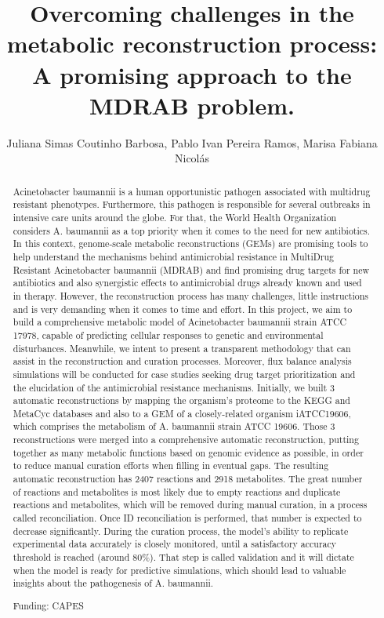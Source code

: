 \documentclass[twoside]{article}
\title{\vspace{-15mm}\fontsize{24pt}{10pt}\selectfont\textbf{ Overcoming challenges in the metabolic reconstruction process: A promising approach to the MDRAB problem. }} %
\author{ Juliana Simas Coutinho Barbosa, Pablo Ivan Pereira Ramos, Marisa Fabiana Nicol\'as }
\affil{ Laborat\'orio Nacional de Computa\c{c}\~ao Cient\'{\i}fica }
\date{}
\begin{document}
  
  
  \maketitle %
  
  
  \thispagestyle{fancy} %
  
  
  \begin{abstract}
  Acinetobacter baumannii is a human opportunistic pathogen associated with multidrug resistant phenotypes. Furthermore,  this pathogen is responsible for several outbreaks in intensive care units around the globe. For that,  the World Health Organization considers A. baumannii as a top priority when it comes to the need for new antibiotics. In this context,  genome-scale metabolic reconstructions (GEMs) are promising tools to help understand the mechanisms behind antimicrobial resistance in MultiDrug Resistant Acinetobacter baumannii (MDRAB) and find promising drug targets for new antibiotics and also synergistic effects to antimicrobial drugs already known and used in therapy. However,  the reconstruction process has many challenges,  little instructions and is very demanding when it comes to time and effort. In this project,  we aim to build a comprehensive metabolic model of Acinetobacter baumannii strain ATCC 17978,  capable of predicting cellular responses to genetic and environmental disturbances. Meanwhile,  we intent to present a transparent methodology that can assist in the reconstruction and curation processes. Moreover,  flux balance analysis simulations will be conducted for case studies seeking drug target prioritization and the elucidation of the antimicrobial resistance mechanisms. Initially,  we built 3 automatic reconstructions by mapping the organism’s proteome to the KEGG and MetaCyc databases and also to a GEM of a closely-related organism iATCC19606,  which comprises the metabolism of A. baumannii strain ATCC 19606. Those 3 reconstructions were merged into a comprehensive automatic reconstruction,  putting together as many metabolic functions based on genomic evidence as possible,  in order to reduce manual curation efforts when filling in eventual gaps. The resulting automatic reconstruction has 2407 reactions and 2918 metabolites. The great number of reactions and metabolites is most likely due to empty reactions and duplicate reactions and metabolites,  which will be removed during manual curation,  in a process called reconciliation. Once ID reconciliation is performed,  that number is expected to decrease significantly. During the curation process,  the model’s ability to replicate experimental data accurately is closely monitored,  until a satisfactory accuracy threshold is reached (around 80\%). That step is called validation and it will dictate when the model is ready for predictive simulations,  which should lead to valuable insights about the pathogenesis of A. baumannii.
  
  Funding: CAPES \\ 
  \end{abstract}
  
\end{document}
